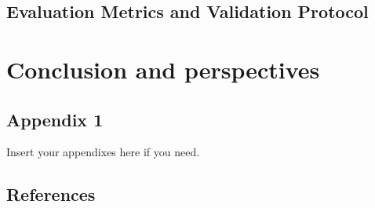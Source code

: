 \documentclass[12pt,a4paper,oneside,english]{book}
\begin{document}
\section{Evaluation Metrics and Validation Protocol} %


\chapter*{Conclusion and perspectives}

\begin{appendix}
\chapter{Appendix 1}
Insert your appendixes here if you need.
\end{appendix}


\section*{References}


\end{document}
